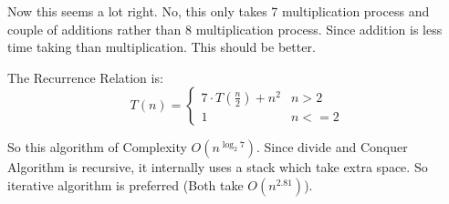 \documentclass[11pt, a4paper]{article}
\begin{document}
Now this seems a lot right. No, this only takes 7 multiplication process and couple of additions rather than 8 multiplication process. Since addition is less time taking than multiplication. This should be better. 

The Recurrence Relation is:
\begin{equation}
    T(n) = 
    \begin{cases}
        7 \cdot T\left(\frac{n}{2}\right) + n^2 & n > 2\\
        1 & n <= 2
    \end{cases}
\end{equation}

So this algorithm of Complexity $O(n^{\log_2{7}})$. Since divide and Conquer Algorithm is recursive, it internally uses a stack which take extra space. So iterative algorithm is preferred (Both take $O(n^{2.81})$).
\end{document}

